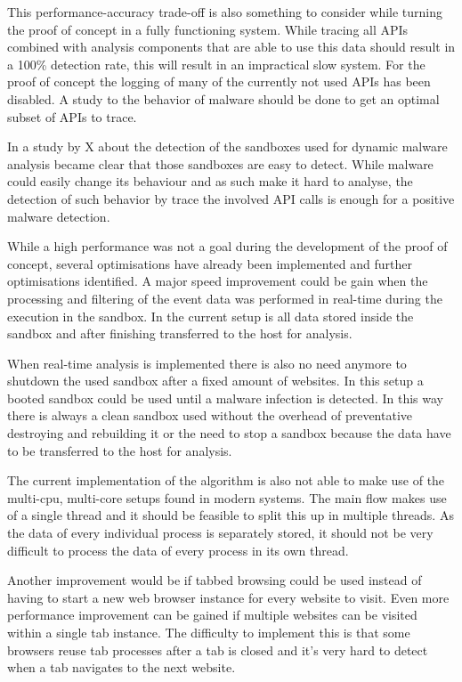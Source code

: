 This performance-accuracy trade-off is also something to consider while turning the proof of concept in a fully functioning system. While tracing all APIs combined with analysis components that are able to use this data should result in a 100\% detection rate, this will result in an impractical slow system. For the proof of concept the logging of many of the currently not used APIs has been disabled. A study to the behavior of malware should be done to get an optimal subset of APIs to trace.

In a study by X\cite{xxx} about the detection of the sandboxes used for dynamic malware analysis became clear that those sandboxes are easy to detect. While malware could easily change its behaviour and as such make it hard to analyse, the detection of such behavior by trace the involved API calls is enough for a positive malware detection.

While a high performance was not a goal during the development of the proof of concept, several optimisations have already been implemented and further optimisations identified. A major speed improvement could be gain when the processing and filtering of the event data was performed in real-time during the execution in the sandbox. In the current setup is all data stored inside the sandbox and after finishing transferred to the host for analysis. 

When real-time analysis is implemented there is also no need anymore to shutdown the used sandbox after a fixed amount of websites. In this setup a booted sandbox could be used until a malware infection is detected. In this way there is always a clean sandbox used without the overhead of preventative destroying and rebuilding it or the need to stop a sandbox because the data have to be transferred to the host for analysis.

The current implementation of the algorithm is also not able to make use of the multi-cpu, multi-core setups found in modern systems. The main flow makes use of a single thread and it should be feasible to split this up in multiple threads. As the data of every individual process is separately stored, it should not be very difficult to process the data of every process in its own thread.

Another improvement would be if tabbed browsing could be used instead of having to start a new web browser instance for every website to visit. Even more performance improvement can be gained if multiple websites can be visited within a single tab instance. The difficulty to implement this is that some browsers reuse tab processes after a tab is closed and it's very hard to detect when a tab navigates to the next website.

